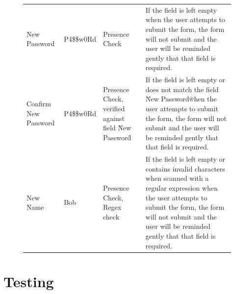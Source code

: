 \begin{figure}
\begin{table}[width=\textwidth]
\begin{tabular}{llll}
New Password                                     & P4\$\$w0Rd                                                             & Presence Check                                                               & If the field is left empty when the user attempts to submit the form, the form will not submit and the user will be reminded gently that that field is required.                                                                                                                                                 \\
Confirm New Password                             & P4\$\$w0Rd                                                             & Presence Check, verified against field \"New Password\"                        & If the field is left empty or does not match the field \"New Password\"  when the user attempts to submit the form, the form will not submit and the user will be reminded gently that that field is required.                                                                                                     \\
New Name                                         & Bob                                                                   & Presence Check, Regex check                                                  & If the field is left empty or contains invalid characters when scanned with a regular expression when the user attempts to submit the form, the form will not submit and the user will be reminded gently that that field is required.
\end{tabular}
\end{table}
\end{figure}

\section{Testing}

